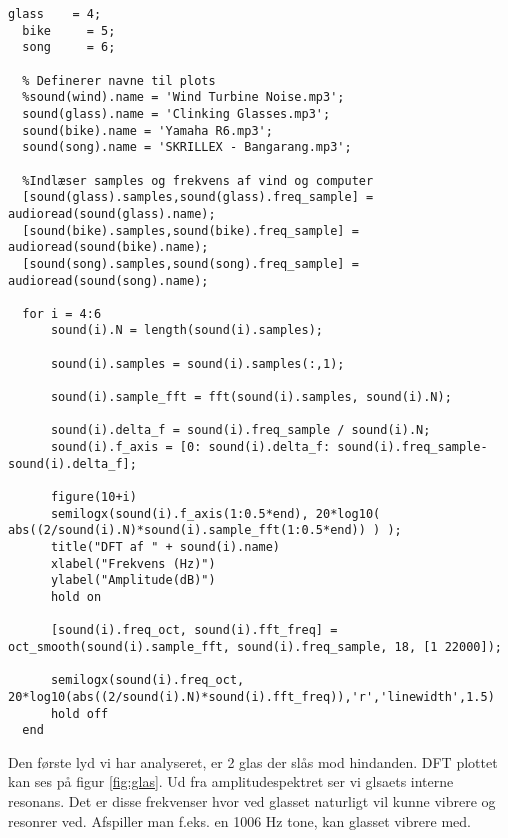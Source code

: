 \documentclass[../main.tex]{subfiles}
\begin{document}
\begin{lstlisting}[caption={Kode til at lave frekvensspektre for vinglas, roterende maskine og musik}, label=lst:lyde]
  glass    = 4;
  bike     = 5;
  song     = 6;
  
  % Definerer navne til plots
  %sound(wind).name = 'Wind Turbine Noise.mp3';
  sound(glass).name = 'Clinking Glasses.mp3';
  sound(bike).name = 'Yamaha R6.mp3';
  sound(song).name = 'SKRILLEX - Bangarang.mp3';
  
  %Indlæser samples og frekvens af vind og computer
  [sound(glass).samples,sound(glass).freq_sample] = audioread(sound(glass).name);
  [sound(bike).samples,sound(bike).freq_sample] = audioread(sound(bike).name);
  [sound(song).samples,sound(song).freq_sample] = audioread(sound(song).name);
  
  for i = 4:6
      sound(i).N = length(sound(i).samples);
      
      sound(i).samples = sound(i).samples(:,1);
      
      sound(i).sample_fft = fft(sound(i).samples, sound(i).N);
      
      sound(i).delta_f = sound(i).freq_sample / sound(i).N;
      sound(i).f_axis = [0: sound(i).delta_f: sound(i).freq_sample-sound(i).delta_f];
      
      figure(10+i)
      semilogx(sound(i).f_axis(1:0.5*end), 20*log10( abs((2/sound(i).N)*sound(i).sample_fft(1:0.5*end)) ) );
      title("DFT af " + sound(i).name)
      xlabel("Frekvens (Hz)")
      ylabel("Amplitude(dB)")
      hold on
      
      [sound(i).freq_oct, sound(i).fft_freq] = oct_smooth(sound(i).sample_fft, sound(i).freq_sample, 18, [1 22000]);
      
      semilogx(sound(i).freq_oct, 20*log10(abs((2/sound(i).N)*sound(i).fft_freq)),'r','linewidth',1.5)
      hold off
  end
\end{lstlisting}


Den første lyd vi har analyseret, er 2 glas der slås mod hindanden. DFT plottet kan ses på figur \ref{fig:glas}. Ud fra amplitudespektret ser vi glsaets interne resonans. Det er disse frekvenser hvor ved glasset naturligt vil kunne vibrere og resonrer ved. Afspiller man f.eks. en 1006 Hz tone, kan glasset vibrere med.

\end{document}
